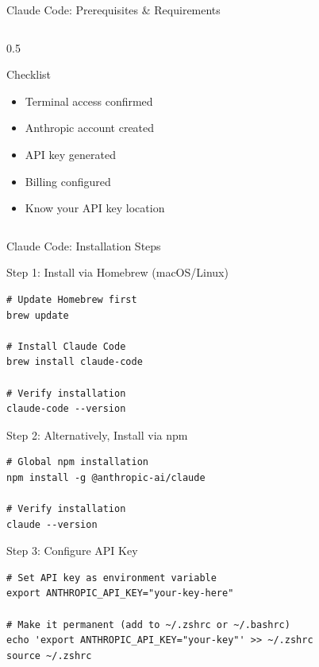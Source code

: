\documentclass[aspectratio=169,11pt]{beamer}
\begin{document}
\begin{frame}{Claude Code: Prerequisites \& Requirements}
\begin{columns}[T]
\begin{column}{0.5\textwidth}
            \begin{exampleblock}{Checklist}
                \begin{itemize}
                    \item[$\square$] Terminal access confirmed
                    \item[$\square$] Anthropic account created
                    \item[$\square$] API key generated
                    \item[$\square$] Billing configured
                    \item[$\square$] Know your API key location
                \end{itemize}
            \end{exampleblock}
        \end{column}
    \end{columns}

\end{frame}

\begin{frame}[fragile]{Claude Code: Installation Steps}
    \begin{block}{Step 1: Install via Homebrew (macOS/Linux)}
        \begin{lstlisting}[style=bash]
# Update Homebrew first
brew update

# Install Claude Code
brew install claude-code

# Verify installation
claude-code --version
        \end{lstlisting}
    \end{block}

    \begin{block}{Step 2: Alternatively, Install via npm}
        \begin{lstlisting}[style=bash]
# Global npm installation
npm install -g @anthropic-ai/claude

# Verify installation
claude --version
        \end{lstlisting}
    \end{block}

    \begin{block}{Step 3: Configure API Key}
        \begin{lstlisting}[style=bash]
# Set API key as environment variable
export ANTHROPIC_API_KEY="your-key-here"

# Make it permanent (add to ~/.zshrc or ~/.bashrc)
echo 'export ANTHROPIC_API_KEY="your-key"' >> ~/.zshrc
source ~/.zshrc
        \end{lstlisting}
    \end{block}

\end{frame}
\end{document}
